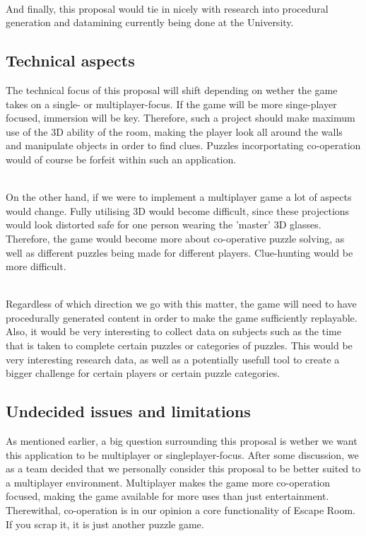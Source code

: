 \documentclass[11pt]{article}
\begin{document}
~\\
And finally, this proposal would tie in nicely with research into procedural generation and datamining currently being done at the University. 


\subsection*{Technical aspects}
The technical focus of this proposal will shift depending on wether the game takes on a single- or multiplayer-focus. If the game will be more singe-player focused, immersion will be key. Therefore, such a project should make maximum use of the 3D ability of the room, making the player look all around the walls and manipulate objects in order to find clues. Puzzles incorportating co-operation would of course be forfeit within such an application. 

~\\
On the other hand, if we were to implement a multiplayer game a lot of aspects would change. Fully utilising 3D would become difficult, since these projections would look distorted safe for one person wearing the 'master' 3D glasses. Therefore, the game would become more about co-operative puzzle solving, as well as different puzzles being made for different players. Clue-hunting would be more difficult.

~\\
Regardless of which direction we go with this matter, the game will need to have procedurally generated content in order to make the game sufficiently replayable. Also, it would be very interesting to collect data on subjects such as the time that is taken to complete certain puzzles or categories of puzzles. This would be very interesting research data, as well as a potentially usefull tool to create a bigger challenge for certain players or certain puzzle categories.


\newpage
{}
\subsection*{Undecided issues and limitations}
As mentioned earlier, a big question surrounding this proposal is wether we want this application to be multiplayer or singleplayer-focus. After some discussion, we as a team decided that we personally consider this proposal to be better suited to a multiplayer environment. Multiplayer makes the game more co-operation focused, making the game available for more uses than just entertainment. Therewithal, co-operation is in our opinion a core functionality of Escape Room. If you scrap it, it is just another puzzle game. 
\end{document}
